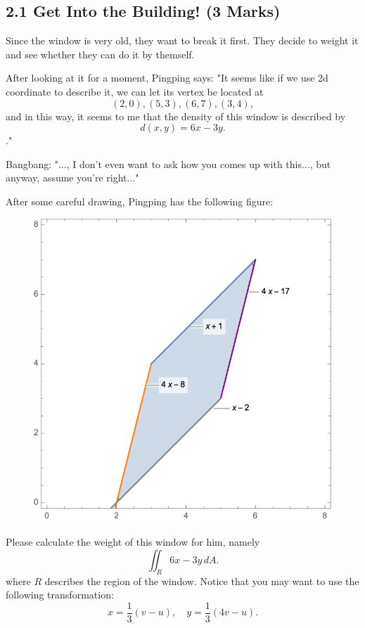 \documentclass[12pt]{article}
\begin{document}
\subsection*{2.1 Get Into the Building! (3 Marks)}
\par Since the window is very old, they want to break it first. They decide to weight it and see whether 
they can do it by themself. 

\par After looking at it for a moment, Pingping says: "It seems like if we use 2d coordinate to describe it, we can 
let its vertex be located at
\begin{equation*}
    (2,0), (5,3), (6,7), (3,4), 
\end{equation*}
and in this way, it seems to me that the density of this window is described by 
\begin{equation*}
    d(x,y) = 6x-3y.
\end{equation*}
." 
\par Bangbang: "..., I don't even want to ask how you comes up with this..., but anyway, assume you're right..."

\par After some careful drawing, Pingping has the following figure:
\begin{figure}[H]
    \centering
    \includegraphics[width = 0.7\linewidth]{Figure/2.1.png}
\end{figure}

\par Please calculate the weight of this window for him, namely 
\begin{equation*}
    \iint_R 6x-3y \,dA.
\end{equation*}
where $R$ describes the region of the window. Notice that you may want to use the following transformation:
\begin{equation*}
    x = \frac{1}{3}(v - u), \quad y = \frac{1}{3}(4v - u).
\end{equation*}
\end{document}

